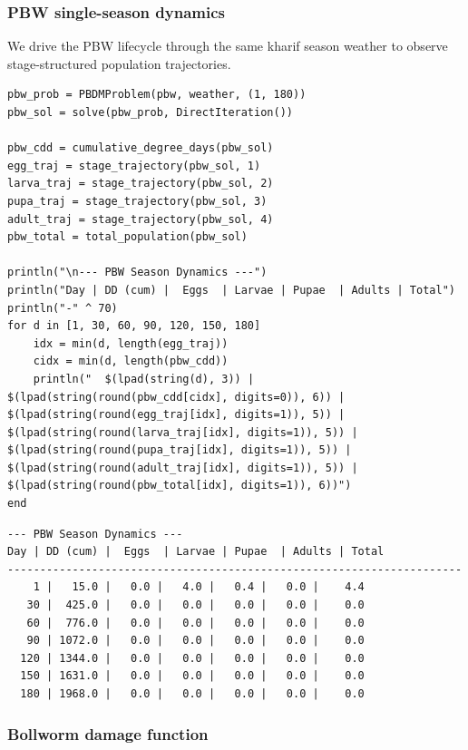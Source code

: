 \subsubsection{PBW single-season dynamics}



\label{453527624158607759}{}


We drive the PBW lifecycle through the same kharif season weather to observe stage-structured population trajectories.




\begin{verbatim}
pbw_prob = PBDMProblem(pbw, weather, (1, 180))
pbw_sol = solve(pbw_prob, DirectIteration())

pbw_cdd = cumulative_degree_days(pbw_sol)
egg_traj = stage_trajectory(pbw_sol, 1)
larva_traj = stage_trajectory(pbw_sol, 2)
pupa_traj = stage_trajectory(pbw_sol, 3)
adult_traj = stage_trajectory(pbw_sol, 4)
pbw_total = total_population(pbw_sol)

println("\n--- PBW Season Dynamics ---")
println("Day | DD (cum) |  Eggs  | Larvae | Pupae  | Adults | Total")
println("-" ^ 70)
for d in [1, 30, 60, 90, 120, 150, 180]
    idx = min(d, length(egg_traj))
    cidx = min(d, length(pbw_cdd))
    println("  $(lpad(string(d), 3)) | $(lpad(string(round(pbw_cdd[cidx], digits=0)), 6)) | $(lpad(string(round(egg_traj[idx], digits=1)), 5)) | $(lpad(string(round(larva_traj[idx], digits=1)), 5)) | $(lpad(string(round(pupa_traj[idx], digits=1)), 5)) | $(lpad(string(round(adult_traj[idx], digits=1)), 5)) | $(lpad(string(round(pbw_total[idx], digits=1)), 6))")
end
\end{verbatim}




\begin{verbatim}
--- PBW Season Dynamics ---
Day | DD (cum) |  Eggs  | Larvae | Pupae  | Adults | Total
----------------------------------------------------------------------
    1 |   15.0 |   0.0 |   4.0 |   0.4 |   0.0 |    4.4
   30 |  425.0 |   0.0 |   0.0 |   0.0 |   0.0 |    0.0
   60 |  776.0 |   0.0 |   0.0 |   0.0 |   0.0 |    0.0
   90 | 1072.0 |   0.0 |   0.0 |   0.0 |   0.0 |    0.0
  120 | 1344.0 |   0.0 |   0.0 |   0.0 |   0.0 |    0.0
  150 | 1631.0 |   0.0 |   0.0 |   0.0 |   0.0 |    0.0
  180 | 1968.0 |   0.0 |   0.0 |   0.0 |   0.0 |    0.0
\end{verbatim}



\subsubsection{Bollworm damage function}



